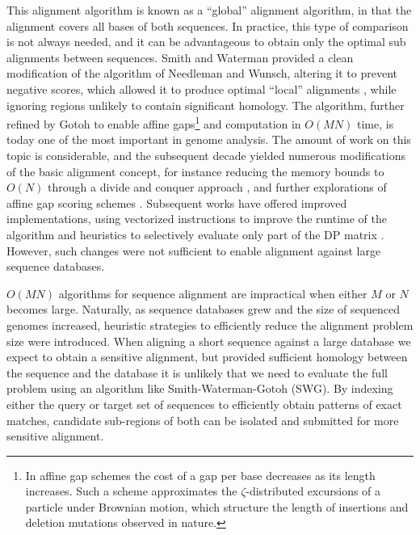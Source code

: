 \documentclass[a4paper,12pt,numbered,oneside]{Classes/PhDThesisPSnPDF}
\begin{document}
This alignment algorithm is known as a ``global'' alignment algorithm, in that the alignment covers all bases of both sequences.
In practice, this type of comparison is not always needed, and it can be advantageous to obtain only the optimal sub alignments between sequences.
Smith and Waterman provided a clean modification of the algorithm of Needleman and Wunsch, altering it to prevent negative scores, which allowed it to produce optimal ``local'' alignments \cite{smith1981comparison}, while ignoring regions unlikely to contain significant homology.
The algorithm, further refined by Gotoh \cite{gotoh1982improved} to enable affine gaps\footnote{In affine gap schemes the cost of a gap per base decreases as its length increases. Such a scheme approximates the $\zeta$-distributed excursions of a particle under Brownian motion, which structure the length of insertions and deletion mutations observed in nature.} and computation in $O(MN)$ time, is today one of the most important in genome analysis.
The amount of work on this topic is considerable, and the subsequent decade yielded numerous modifications of the basic alignment concept, for instance reducing the memory bounds to $O(N)$ through a divide and conquer approach \cite{myers1988optimal}, and further explorations of affine gap scoring schemes \cite{altschul1986optimal,gotoh1990optimal}.
Subsequent works have offered improved implementations, using vectorized instructions to improve the runtime of the algorithm \cite{farrar2007striped} and heuristics to selectively evaluate only part of the DP matrix \cite{suzuki2017acceleration}.
However, such changes were not sufficient to enable alignment against large sequence databases.

$O(MN)$ algorithms for sequence alignment are impractical when either $M$ or $N$ becomes large.
Naturally, as sequence databases grew and the size of sequenced genomes increased, heuristic strategies to efficiently reduce the alignment problem size were introduced.
When aligning a short sequence against a large database we expect to obtain a sensitive alignment, but provided sufficient homology between the sequence and the database it is unlikely that we need to evaluate the full problem using an algorithm like Smith-Waterman-Gotoh (SWG).
By indexing either the query or target set of sequences to efficiently obtain patterns of exact matches, candidate sub-regions of both can be isolated and submitted for more sensitive alignment.
\end{document}
